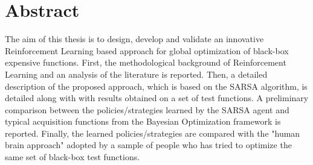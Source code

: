 \chapter*{Abstract}
\pagestyle{plain}

The aim of this thesis is to design, develop and validate an innovative Reinforcement Learning based approach for global optimization of black-box expensive functions.
First, the methodological background of Reinforcement Learning and an analysis of the literature is reported. Then, a detailed description of the proposed approach, which is based on the SARSA algorithm, is detailed along with with results obtained on a set of test functions. A preliminary comparison between the policies/strategies learned by the SARSA agent and typical acquisition functions from the Bayesian Optimization framework is reported. Finally, the learned policies/strategies are compared with the "human brain approach" adopted by a sample of people who has tried to optimize the same set of black-box test functions.